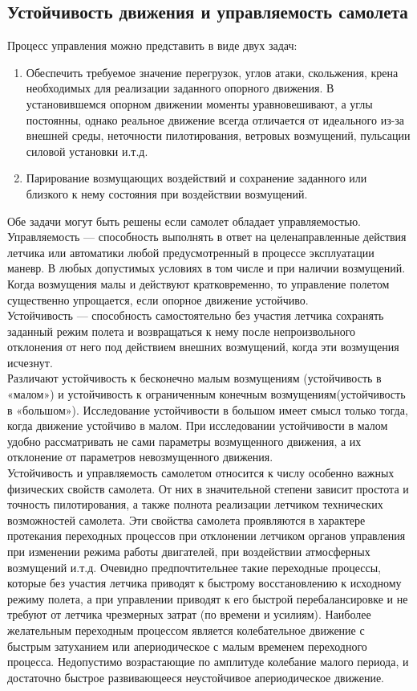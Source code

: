 \documentclass{article}
\begin{document}
\subsection{Устойчивость движения и управляемость самолета}
Процесс управления можно представить в виде двух задач:
\begin{enumerate}
	\item Обеспечить требуемое значение перегрузок, углов атаки, скольжения, крена необходимых для реализации заданного опорного движения. В установившемся опорном движении моменты уравновешивают, а углы постоянны, однако реальное движение всегда отличается от идеального из-за внешней среды, неточности пилотирования, ветровых возмущений, пульсации силовой установки и.т.д.
	      
	\item Парирование возмущающих воздействий и сохранение заданного или близкого к нему состояния при воздействии возмущений.
\end{enumerate}
Обе задачи могут быть решены если самолет обладает управляемостью. \\
Управляемость --- способность выполнять в ответ на целенаправленные действия летчика или автоматики любой предусмотренный в процессе эксплуатации маневр. В любых допустимых условиях в том числе и при наличии возмущений. Когда возмущения малы и действуют кратковременно, то управление полетом существенно упрощается, если опорное движение устойчиво.\\
Устойчивость --- способность самостоятельно без участия летчика сохранять заданный режим полета и возвращаться к нему после непроизвольного отклонения от него под действием внешних возмущений, когда эти возмущения исчезнут.\\
Различают устойчивость к бесконечно малым возмущениям (устойчивость в «малом») и устойчивость к ограниченным конечным возмущениям(устойчивость в «большом»).
Исследование устойчивости в большом имеет смысл только тогда, когда движение устойчиво в малом. При исследовании устойчивости в малом удобно рассматривать не сами параметры возмущенного движения, а их отклонение от параметров невозмущенного движения.\\
Устойчивость и управляемость самолетом относится к числу особенно важных физических свойств самолета. От них в значительной степени зависит простота и точность пилотирования, а также полнота реализации летчиком технических возможностей самолета. Эти свойства самолета проявляются в характере протекания переходных процессов при отклонении летчиком органов управления при изменении режима работы двигателей, при воздействии атмосферных возмущений и.т.д. Очевидно предпочтительнее такие переходные процессы, которые без участия летчика приводят к быстрому восстановлению к исходному режиму полета, а при управлении приводят к его быстрой перебалансировке и не требуют от летчика чрезмерных затрат (по времени и усилиям). Наиболее желательным переходным процессом является колебательное движение с быстрым затуханием или апериодическое с малым временем переходного процесса. Недопустимо возрастающие по амплитуде колебание малого периода, и достаточно быстрое развивающееся неустойчивое апериодическое движение.\\
\end{document}
